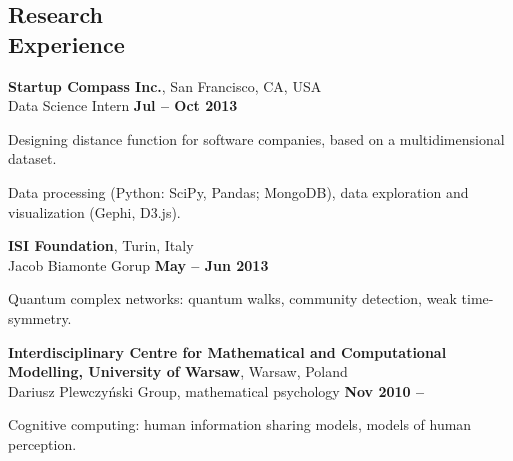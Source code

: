 \documentclass[margin,line]{resume}
\begin{document}
\begin{resume}

\newpage

    \section{\mysidestyle Research\\Experience}

    {\bf  Startup Compass Inc.}, San Francisco, CA, USA\\
    Data Science Intern \hfill {\bf Jul -- Oct 2013}\\
    \begin{list2}
        \vspace*{-4mm}
        \item Designing distance function for software companies, based on a multidimensional dataset.
        \item Data processing (Python: SciPy, Pandas; MongoDB), data exploration and visualization (Gephi, D3.js).
    \end{list2}

    {\bf  ISI Foundation}, Turin, Italy\\
    Jacob Biamonte Gorup \hfill {\bf May -- Jun 2013}\\
    \begin{list2}
        \vspace*{-4mm}
        \item Quantum complex networks: quantum walks, community detection, weak time-symmetry.
    \end{list2}

	{\bf  Interdisciplinary Centre for Mathematical and Computational Modelling, University of Warsaw}, Warsaw, Poland\\
	Dariusz Plewczyński Group, mathematical psychology \hfill {\bf Nov 2010 -- }\\
    \begin{list2}
        \vspace*{-4mm}
        \item Cognitive computing: human information sharing models, models of human perception.
    \end{list2}


\end{resume}
\end{document}
